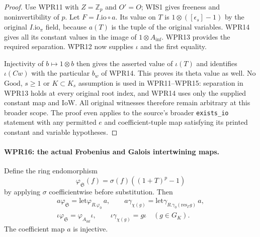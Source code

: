 \begin{proof}
Use WPR11 with $Z=\mathbb Z_p$ and $O'=O$; WIS1 gives
freeness and noninvertibility of $p$. Let $F=I.\mathrm{io}\circ a$.
Its value on $T$ is $1\otimes([\epsilon_s]-1)$ by the original
$I.\mathrm{io}_\pi$ field, because $a(T)$ is the tuple of
the original variables. WPR14 gives all its constant values in
the image of $1\otimes A_{\mathrm{inf}}$. WPR13 provides the required
separation. WPR12 now supplies $\iota$ and the first equality.

Injectivity of $b\mapsto1\otimes b$ then gives the asserted
value of $\iota(T)$ and identifies $\iota(Cw)$ with the
particular $b_w$ of WPR14. This proves its theta value as well.
No $\mathrm{Good}$, $s\geq1$ or $K\subset K_s$ assumption
is used in WPR11--WPR15: separation in WPR13 holds at every
original root index, and WPR14 uses only the supplied constant
map and $\mathrm{IoW}$. All original witnesses therefore remain
arbitrary at this broader scope. The proof even applies
to the source's broader \texttt{exists\_io} statement with any
permitted $e$ and coefficient-tuple map satisfying its printed
constant and variable hypotheses.
\end{proof}

\paragraph{WPR16: the actual Frobenius and Galois intertwining maps.}
\label{claim:WPR16}
Define the ring endomorphism
\[
 \varphi_{\mathfrak S}(f)
       =\sigma(f)((1+T)^p-1)
\]
by applying $\sigma$ coefficientwise before substitution. Then
\[
 \begin{gathered}
 a\varphi_{\mathfrak S}=\mathrm{let}\varphi_{R.\varphi_0}\,a,
 \qquad a\gamma_{\chi(g)}
       =\mathrm{let}\gamma_{R.\gamma_0(\mathrm{res}_\Gamma g)}\,a,\\
 \iota\varphi_{\mathfrak S}=\varphi_{A_{\mathrm{inf}}}\iota,
 \qquad \iota\gamma_{\chi(g)}=g\iota
                                \quad(g\in G_K).
 \end{gathered}                                                     \tag{WPR.18}
\]
The coefficient map $a$ is injective.

